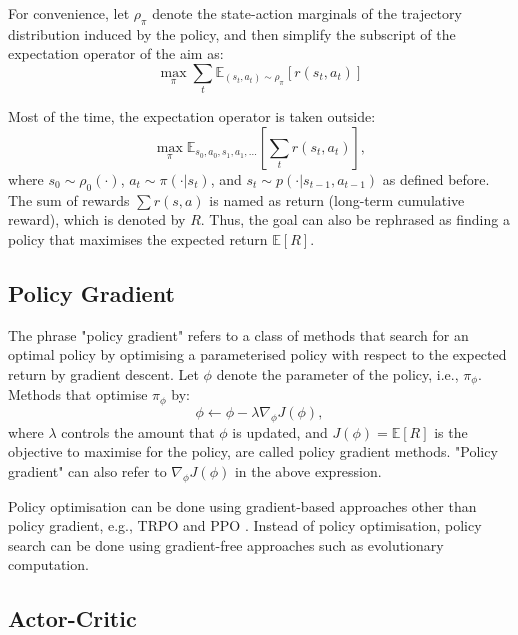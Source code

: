 {For convenience, let $\rho_\pi$ denote the state-action marginals of the trajectory distribution induced by the policy, and then simplify the subscript of the expectation operator of the aim as:
\begin{displaymath}
\max_{\pi} \sum_{t} \mathbb{E}_{(s_t, a_t) \sim \rho_\pi} \left[ r(s_t,a_t) \right]
\end{displaymath}

Most of the time, the expectation operator is taken outside:
\begin{displaymath}
\max_{\pi} \mathbb{E}_{s_0, a_0, s_1, a_1, \ldots} \left[ \sum_{t} r(s_t,a_t) \right],
\end{displaymath}
where $s_0 \sim \rho_0(\cdot)$, $a_t \sim \pi(\cdot|s_t)$, and $s_{t} \sim p(\cdot|s_{t-1},a_{t-1})$ as defined before. The sum of rewards $\sum r(s,a)$ is named as return (long-term cumulative reward), which is denoted by $R$. Thus, the goal can also be rephrased as finding a policy that maximises the expected return $\mathbb{E} \left[ R \right]$.

\subsection{Policy Gradient}

The phrase "policy gradient" refers to a class of methods that search for an optimal policy by optimising a parameterised policy with respect to the expected return by gradient descent. Let $\phi$ denote the parameter of the policy, i.e., $\pi_\phi$. Methods that optimise $\pi_\phi$ by:
\begin{displaymath}
\phi \gets \phi - \lambda\nabla_{\phi}J(\phi),
\end{displaymath}
where $\lambda$ controls the amount that $\phi$ is updated, and $J(\phi) = \mathbb{E} \left[ R \right]$ is the objective to maximise for the policy, are called policy gradient methods. "Policy gradient" can also refer to $\nabla_{\phi}J(\phi)$ in the above expression.

Policy optimisation can be done using gradient-based approaches other than policy gradient, e.g., TRPO \cite{ref:trpo} and PPO \cite{ref:ppo}. Instead of policy optimisation, policy search can be done using gradient-free approaches such as evolutionary computation.

\subsection{Actor-Critic}

}
